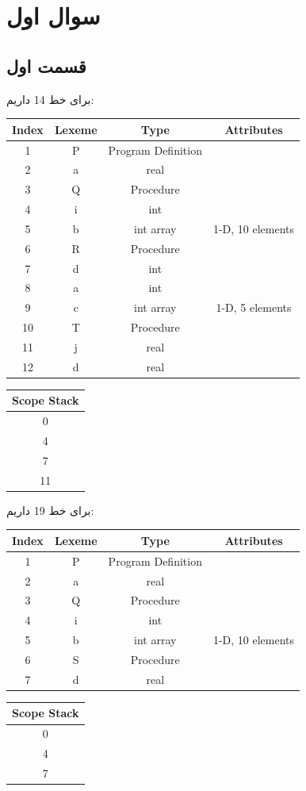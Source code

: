 \documentclass[]{article}
\begin{document}
\printheader

\section*{سوال اول}
\subsection*{قسمت اول}
برای خط 14 داریم:
\begin{latin}
\centering
\begin{tabular}{|c|c|c|c|}
    \hline
    Index & Lexeme & Type & Attributes\\
    \hline
    1 & P & Program Definition & \\
    2 & a & real & \\
    3 & Q & Procedure & \\
    4 & i & int & \\
    5 & b & int array & 1-D, 10 elements \\
    6 & R & Procedure & \\
    7 & d & int & \\
    8 & a & int & \\
    9 & c & int array & 1-D, 5 elements \\
    10 & T & Procedure & \\
    11 & j & real & \\
    12 & d & real & \\
    \hline
\end{tabular}
\begin{tabular}{|c|}
    \hline
    Scope Stack\\
    \hline
    0\\
    \hline
    4\\
    \hline
    7\\
    \hline
    11\\
    \hline
\end{tabular}
\end{latin}
برای خط 19 داریم:
\begin{latin}
\centering
\begin{tabular}{|c|c|c|c|}
    \hline
    Index & Lexeme & Type & Attributes\\
    \hline
    1 & P & Program Definition & \\
    2 & a & real & \\
    3 & Q & Procedure & \\
    4 & i & int & \\
    5 & b & int array & 1-D, 10 elements \\
    6 & S & Procedure & \\
    7 & d & real & \\
    \hline
\end{tabular}
\begin{tabular}{|c|}
    \hline
    Scope Stack\\
    \hline
    0\\
    \hline
    4\\
    \hline
    7\\
    \hline
\end{tabular}
\end{latin}
\end{document}
